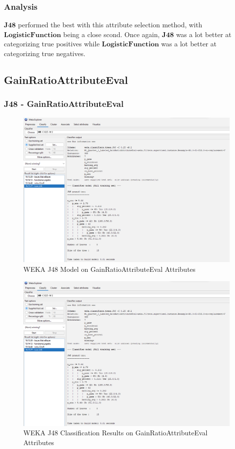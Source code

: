 \documentclass[12pt]{article}
\begin{document}
\newpage
\subsubsection{Analysis}
$\textbf{J48}$ performed the best with this attribute selection method, with $\textbf{LogisticFunction}$ being a close scond. Once again, $\textbf{J48}$ was a lot better at categorizing true positives while $\textbf{LogisticFunction}$ was a lot better at categorizing true negatives. 


\newpage
\subsection{GainRatioAttributeEval}

\subsubsection{J48 - GainRatioAttributeEval}
\begin{figure}[h!]
    \includegraphics[scale=0.4]{./images/GainRatioAttributeEval/J48-Model.png}
\centering
    \caption{WEKA J48 Model on GainRatioAttributeEval Attributes}
\end{figure}
\newpage
\begin{figure}[h!]
    \includegraphics[scale=0.4]{./images/GainRatioAttributeEval/J48-Model.png}
\centering
    \caption{WEKA J48 Classification Results on GainRatioAttributeEval Attributes}
\end{figure}
\end{document}
